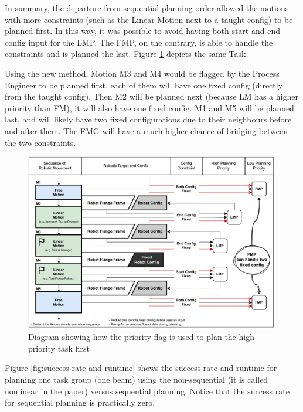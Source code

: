 In summary, the departure from sequential planning order allowed the motions with more constraints (such as the Linear Motion next to a taught config) to be planned first. In this way, it was possible to avoid having both start and end config input for the LMP. The FMP, on the contrary, is able to handle the constraints and is planned the last. Figure \ref{fig:priority-flag-no-over-constraint} depicts the same  Task. 

Using the new method, Motion M3 and M4 would be flagged by the Process Engineer to be planned first, each of them will have one fixed config (directly from the taught config). Then M2 will be planned next (because LM has a higher priority than FM), it will also have one fixed config. M1 and M5 will be planned last, and will likely have two fixed configurations due to their neighbours before and after them. The FMG will have a much higher chance of bridging between the two constraints. 

\begin{figure}[!h]
    \centering
    \includegraphics[width=0.99\textwidth]{images/6a/planningorder-2.pdf}
    \caption{Diagram showing how the priority flag is used to plan the high priority task first}
    \label{fig:priority-flag-no-over-constraint}
\end{figure}


Figure \ref{fig:success-rate-and-runtime} \parencite{huangNewAnalogProtocol2021} shows the success rate and runtime for planning one task group (one beam) using the non-sequential (it is called nonlinear in the paper) versus sequential planning. Notice that the success rate for sequential planning is practically zero. 

